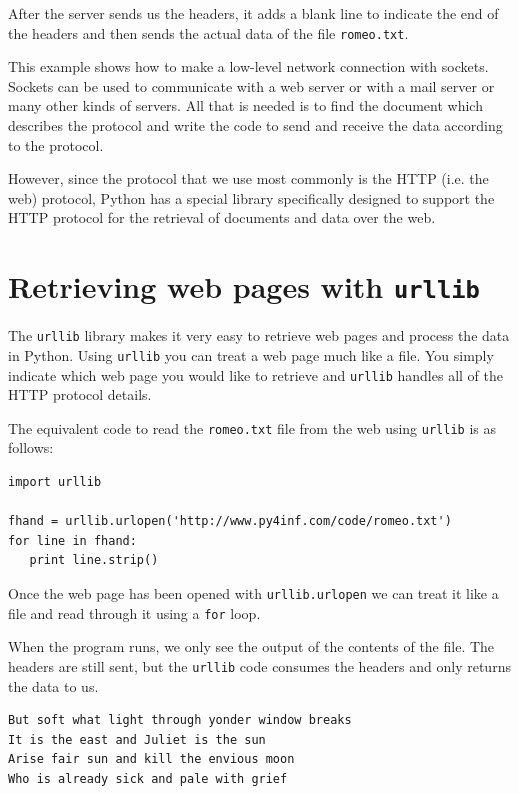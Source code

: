 \documentclass[11pt]{book}
\begin{document}
After the server sends us the headers, it adds a blank line
to indicate the end of the headers and then sends the actual
data of the file {\tt romeo.txt}.

This example shows how to make a low-level network connection
with sockets.   Sockets can be used to communicate with a web
server or with a mail server or many other kinds of servers.
All that is needed is to find the document which describes
the protocol and write the code to send and receive the data
according to the protocol.

However, since the protocol that we use most commonly is
the HTTP (i.e. the web) protocol, Python has a special 
library specifically designed to support the HTTP protocol 
for the retrieval of
documents and data over the web.

\section{Retrieving web pages with {\tt urllib}}

The {\tt urllib} library makes it very easy to retrieve
web pages and process the data in Python.   Using {\tt urllib}
you can treat a web page much like a file.   You simply
indicate which web page you would like to retrieve and
{\tt urllib} handles all of the HTTP protocol details.

The equivalent code to read the {\tt romeo.txt} file
from the web using {\tt urllib} is as follows:

\beforeverb
\begin{verbatim}
import urllib

fhand = urllib.urlopen('http://www.py4inf.com/code/romeo.txt')
for line in fhand:
   print line.strip()
\end{verbatim}
\afterverb
%
Once the web page has been opened with 
{\tt urllib.urlopen} we can treat it like 
a file and read through it using a 
{\tt for} loop.   

When the program runs, we only see the output
of the contents of the file.   The headers
are still sent, but the {\tt urllib} code
consumes the headers and only returns the 
data to us.

\beforeverb
\begin{verbatim}
But soft what light through yonder window breaks
It is the east and Juliet is the sun
Arise fair sun and kill the envious moon
Who is already sick and pale with grief
\end{verbatim}
\afterverb
%
\end{document}
